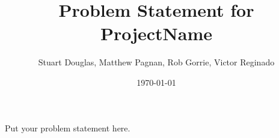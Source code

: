 \documentclass[12pt]{article}
\begin{document}
\title{Problem Statement for ProjectName} 
\author{Stuart Douglas, Matthew Pagnan, Rob Gorrie, Victor Reginado}
\date{\today}
	
\maketitle

Put your problem statement here.
\end{document}
